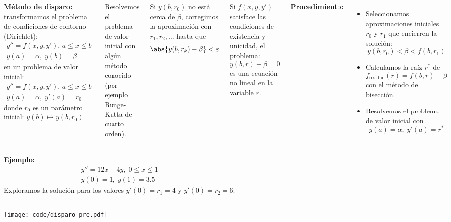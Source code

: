\documentclass[9pt, aspectratio=169]{beamer}
\begin{document}
\begin{frame}
    \begin{columns}[t]
\cx
\textbf{Método de disparo:} transformamos el problema de condiciones de contorno (Dirichlet):
\[ \begin{split} y'' = f(x, y, y'), \, a \leq x \leq b \\ y(a) = \alpha,\; y(b) = \beta \end{split} \]
en un problema de valor inicial:
\[ \begin{split} y'' = f(x, y, y'), \, a \leq x \leq b \\ y(a) = \alpha,\; y'(a) = r_0 \end{split} \]
donde $r_0$ es un parámetro inicial: $y(b) \mapsto y(b, r_0)$ 

Resolvemos el problema de valor inicial con algún método conocido (por ejemplo Runge-Kutta de cuarto orden).

Si $y(b, r_0)$ no está cerca de $\beta$, corregimos la aproximación con $r_1, r_2, \ldots$ hasta que 
\[
    \abs{y(b, r_k) - \beta} < \varepsilon
\]

\cx
Si $f(x, y, y')$ satisface las condiciones de existencia y unicidad, el problema:
\[ y(b, r) - \beta = 0 \]
es una ecuación no lineal en la variable $r$. \pause

\textbf{Procedimiento:}
\begin{itemize}
    \item Seleccionamos aproximaciones iniciales $r_0$ y $r_1$ que \alert{encierren} la solución: 
        \[ y(b, r_0) < \beta < f(b, r_1) \]
    \item Calculamos la raíz $r^*$ de
        \[ f_{\text{residuo}}(r) = f(b, r) - \beta \]
        con el método de bisección.
    \item Resolvemos el problema de valor inicial con 
        \[y(a) = \alpha,\; y'(a) = r^{*} \]
\end{itemize}
\end{columns}
\end{frame}

\begin{frame}
    \begin{columns}[t]
\textbf{Ejemplo:}
\[ \begin{split} y'' = 12 x - 4 y, \; 0 \leq x \leq 1 \\ y(0) = 1,\; y(1) = 3.5 \end{split} \]
Exploramos la solución para los valores $y'(0) = r_1 = 4$ y $y'(0) = r_2 = 6$:
\end{columns}
\begin{center}
   \texttt{[image: code/disparo-pre.pdf]}
\end{center}
\end{frame}
\end{document}
